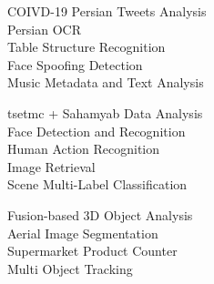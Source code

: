 \documentclass[9pt]{developercv} %
\begin{document}

\begin{minipage}[t]{0.3\textwidth}
	\vspace{-\baselineskip} %
	
	
	COIVD-19 Persian Tweets Analysis
	\\Persian OCR
	\\Table Structure Recognition
	\\Face Spoofing Detection
	\\Music Metadata and Text Analysis
	
\end{minipage}
\begin{minipage}[t]{0.3\textwidth}
	\vspace{-\baselineskip} %
	
	
	tsetmc + Sahamyab Data Analysis
	\\Face Detection and Recognition
	\\Human Action Recognition
	\\Image Retrieval
	\\Scene Multi-Label Classification
	
\end{minipage}
\begin{minipage}[t]{0.3\textwidth}
	\vspace{-\baselineskip} %
	
	
	Fusion-based 3D Object Analysis
	\\Aerial Image Segmentation
	\\Supermarket Product Counter
	\\Multi Object Tracking
	
\end{minipage}	





\end{document}
